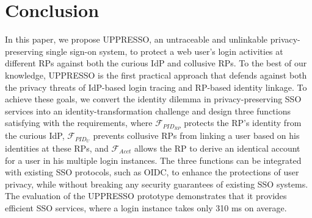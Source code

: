 \section{Conclusion}
\label{sec:conclusion}
In this paper, we propose UPPRESSO, an untraceable and unlinkable privacy-preserving single sign-on system,
 to protect a web user's login activities at different RPs against both the curious IdP and collusive RPs.
To the best of our knowledge,
 UPPRESSO is the first practical approach
    that defends against both the privacy threats of IdP-based login tracing and RP-based identity linkage.
To achieve these goals, we convert the identity dilemma in privacy-preserving SSO services into an identity-transformation challenge
 and design three functions satisfying with the requirements,
 where $\mathcal{F}_{PID_{RP}}$ protects the RP's identity from the curious IdP,
 $\mathcal{F}_{PID_{U}}$ prevents collusive RPs from linking a user based on his identities at these RPs,
 and $\mathcal{F}_{Acct}$ allows the RP to derive an identical account for a user in his multiple login instances.
The three functions can be integrated with existing SSO protocols,
    such as OIDC,
    to enhance the protections of user privacy,
    while without breaking any security guarantees of existing SSO systems.
The evaluation of the UPPRESSO prototype demonstrates
 that it provides efficient SSO services, where a login instance takes only 310 ms on average.
